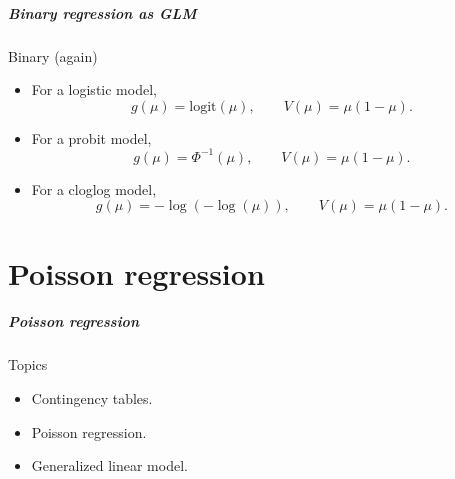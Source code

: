 \documentclass[handout]{beamer}
\newcommand{\logit}{\text{logit}}
\begin{document}

   \begin{frame} \frametitle{Binary regression as GLM}

   \begin{block}
      {Binary (again)}
      \begin{itemize}

      \item For a logistic model, $$g(\mu)=\logit(\mu), \qquad V(\mu)=\mu(1-\mu).$$

      \item For a probit model, $$g(\mu)=\Phi^{-1}(\mu), \qquad V(\mu)=\mu(1-\mu).$$

      \item For a cloglog model, $$g(\mu)=-\log(-\log(\mu)), \qquad V(\mu)=\mu(1-\mu).$$

      \end{itemize}
   \end{block}
   \end{frame}

   \part{Poisson regression}
   \frame{\partpage}


   \begin{frame} \frametitle{Poisson regression}

   \begin{block}
   {Topics}
   \begin{itemize}


     \item Contingency tables.

     \item Poisson regression.


     \item Generalized linear model.

   \end{itemize}

   \end{block}
   \end{frame}

\end{document}
